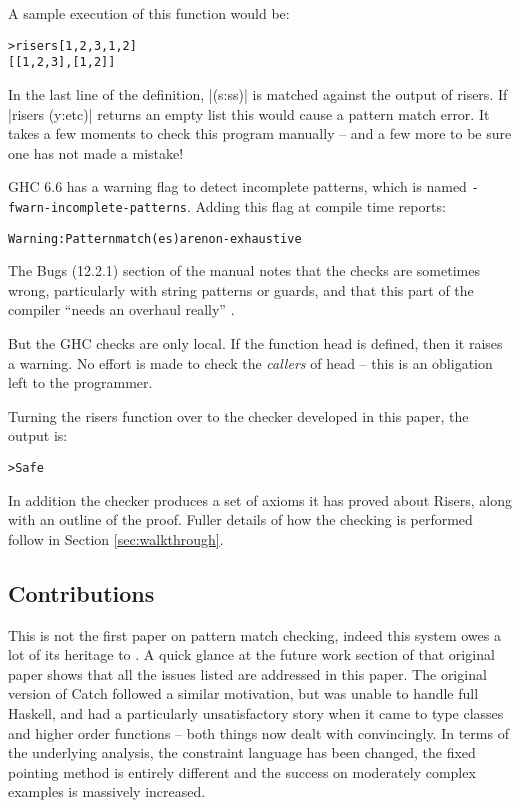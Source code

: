 \documentclass[preprint]{sigplanconf}
\newcommand{\T}[1]{\texttt{#1}}
\newcommand{\C}[1]{\textsf{#1}}
\newenvironment{code}{\begin{alltt}\small}{\end{alltt}}
\begin{document}
A sample execution of this function would be:

\begin{code}
> risers [1,2,3,1,2]
[[1,2,3],[1,2]]
\end{code}

In the last line of the definition, |(s:ss)| is matched against the output of \C{risers}. If |risers (y:etc)| returns an empty list this would cause a pattern match error. It takes a few moments to check this program manually -- and a few more to be sure one has not made a mistake!

GHC \citep{ghc_manual} 6.6 has a warning flag to detect incomplete patterns, which is named \T{-fwarn-incomplete-patterns}. Adding this flag at compile time reports:

\begin{code}
Warning: Pattern match(es) are non-exhaustive
\end{code}

The Bugs (12.2.1) section of the manual notes that the checks are sometimes wrong, particularly with string patterns or guards, and that this part of the compiler ``needs an overhaul really'' \citep{ghc_manual}.

But the GHC checks are only local. If the function \C{head} is defined, then it raises a warning. No effort is made to check the \textit{callers} of \C{head} -- this is an obligation left to the programmer.

Turning the \C{risers} function over to the checker developed in this paper, the output is:

\begin{code}
> Safe
\end{code}

In addition the checker produces a set of axioms it has proved about Risers, along with an outline of the proof. Fuller details of how the checking is performed follow in Section \ref{sec:walkthrough}.

\subsection{Contributions}

This is not the first paper on pattern match checking, indeed this system owes a lot of its heritage to \citet{catch_tfp}. A quick glance at the future work section of that original paper shows that all the issues listed are addressed in this paper. The original version of Catch followed a similar motivation, but was unable to handle full Haskell, and had a particularly unsatisfactory story when it came to type classes and higher order functions -- both things now dealt with convincingly. In terms of the underlying analysis, the constraint language has been changed, the fixed pointing method is entirely different and the success on moderately complex examples is massively increased.
\end{document}

